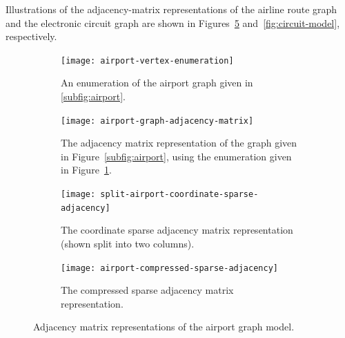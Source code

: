 Illustrations of the adjacency-matrix representations of the airline route graph and the electronic circuit graph are shown in Figures~\ref{fig:airport-representation} and~\ref{fig:circuit-model}, respectively.

\begin{figure}[tbh]
  \begin{subfigure}[t]{0.175\textwidth}
    \centering
    \texttt{[image: airport-vertex-enumeration]}
    \caption{\label{fig:airport-vertex-enumeration}
    An enumeration of the airport graph given in \protect\ref{subfig:airport}.}
  \end{subfigure}
  \hspace{1em}
  \begin{subfigure}[t]{0.25\textwidth}
    \centering
    \texttt{[image: airport-graph-adjacency-matrix]}
    \caption{\label{fig:airport-graph-adjacency-matrix}
    The adjacency matrix representation of the graph given in Figure~\protect\ref{subfig:airport},
    using the enumeration given in Figure~\protect\ref{fig:airport-vertex-enumeration}.}
  \end{subfigure}
  \hspace{1em}
  \begin{subfigure}[t]{0.175\textwidth}
    \small
    \centering
    \texttt{[image: split-airport-coordinate-sparse-adjacency]}
    \caption{\label{fig:airport-coordinate-sparse-adjacency}
    The coordinate sparse adjacency matrix representation (shown split into two columns).}
  \end{subfigure}
  \hspace{1em}
  \begin{subfigure}[t]{0.3\textwidth}
    \small
    \centering
    \texttt{[image: airport-compressed-sparse-adjacency]}
    \caption{\label{fig:airport-compressed-sparse-adjacency}
    The compressed sparse adjacency matrix representation.}
  \end{subfigure}
  \caption{Adjacency matrix representations of the airport graph model.\label{fig:airport-representation}}
\end{figure}



